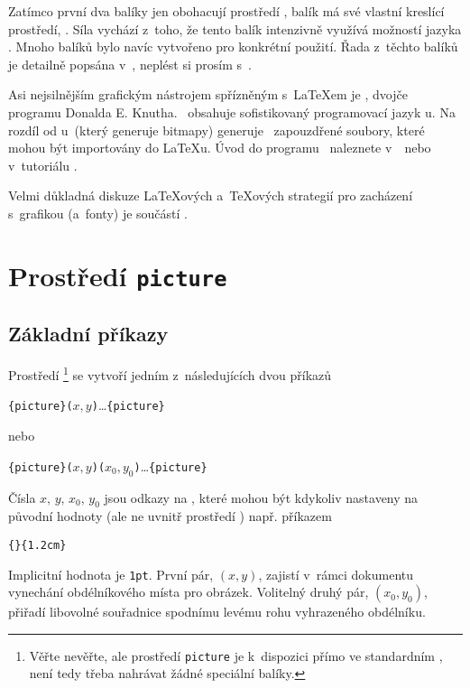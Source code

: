 Zatímco první dva balíky jen obohacují prostředí , balík 
má své vlastní kreslící prostředí, . Síla  vychází
z~toho, že tento balík intenzivně využívá možností jazyka \PSi. Mnoho balíků bylo
navíc vytvořeno pro konkrétní použití. Řada z~těchto balíků je detailně popsána
v~\graphicscompanion, neplést si prosím s~\companion.

Asi nejsilnějším grafickým nástrojem spřízněným s~\LaTeX em je \MP, dvojče programu \MF{}
Donalda E. Knutha. \MP\ obsahuje sofistikovaný programovací jazyk \MF u. Na rozdíl
od \MF u~(který generuje bitmapy) generuje \MP\ zapouzdřené \PSi{} soubory,
které mohou být importovány do \LaTeX u. Úvod do programu \MP\ naleznete v~\hobby\ nebo
v~tutoriálu \cite{ursoswald}.

Velmi důkladná diskuze \LaTeX ových a~\TeX ových strategií pro zacházení s~grafikou
(a~fonty) je součástí \hoenig.

\section{Prostředí \texttt{picture}}

\subsection{Základní příkazy}

Prostředí \footnote{Věřte nevěřte, ale prostředí \texttt{picture} je k~dispozici
přímo ve standardním \LaTeXe, není tedy třeba nahrávat žádné speciální balíky.} se vytvoří
jedním z~následujících dvou příkazů
\begin{lscommand}
\verb|{picture}(|$x,y$\verb|)|\ldots{}\verb|{picture}|
\end{lscommand}
\noindent nebo
\begin{lscommand}
\verb|{picture}(|$x,y$\verb|)(|$x_0,y_0$\verb|)|\ldots{}\verb|{picture}|
\end{lscommand}
Čísla $x,\,y,\,x_0,\,y_0$ jsou odkazy na , které mohou být kdykoliv nastaveny
na původní hodnoty (ale ne uvnitř prostředí ) např. příkazem 
\begin{lscommand}
\verb|{|\verb|}{1.2cm}|
\end{lscommand}
Implicitní hodnota  je \texttt{1pt}. První pár, $(x,y)$, zajistí v~rámci
dokumentu vynechání obdélníkového místa pro obrázek. Volitelný druhý pár,
$(x_0,y_0)$, přiřadí libovolné souřadnice spodnímu levému rohu vyhrazeného obdélníku.


